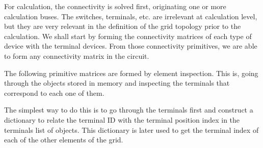 \documentclass[nols,a4paper,twoside,symmetric,notoc,fleqn]{tufte-book}
\begin{document}
For calculation, the connectivity is solved first, originating one or more calculation buses. The switches, terminals, etc. are irrelevant at calculation level, but they are very relevant in the definition of the grid topology prior to the calculation. We shall start by forming the connectivity matrices of each type of device with the terminal devices. From those connectivity primitives, we are able to form any connectivity matrix in the circuit. 

The following primitive matrices are formed by element inspection. This is, going through the objects stored in memory and inspecting the terminals that correspond to each one of them.

The simplest way to do this is to go through the terminals first and construct a dictionary to relate the terminal ID with the terminal position index in the terminals list of objects. This dictionary is later used to get the terminal index of each of the other elements of the grid.

\begin{table}[ht]
	\centering
	\caption{Connectivity matrix of the connectivity nodes (Buses) with the terminals: $[C_{bus,terminal}]$}
\end{table}
\end{document}
